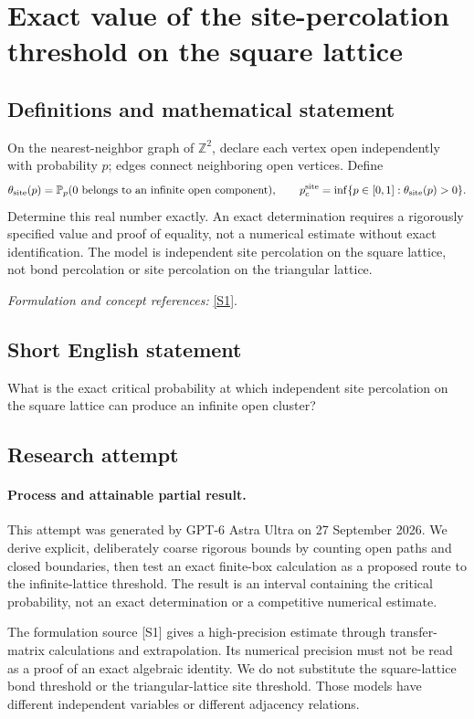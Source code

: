 \documentclass[11pt]{article}
\begin{document}
\section*{\texorpdfstring{Exact value of the site-percolation threshold on the square lattice}{Exact value of the site-percolation threshold on the square lattice}}\label{statement}
\subsection{Definitions and mathematical statement}
On the nearest-neighbor graph of ${\mathbb{Z}}^2$, declare each vertex open independently with probability $p$; edges connect neighboring open vertices. Define
\[
 \theta_{\rm site}(p)={\mathbb{P}}_p(0\text{ belongs to an infinite open component}),
 \qquad
 p_c^{\rm site}=\inf\{p\in[0,1]:\theta_{\rm site}(p)>0\}.
\]
Determine this real number exactly. An exact determination requires a rigorously specified value and proof of equality, not a numerical estimate without exact identification. The model is independent site percolation on the square lattice, not bond percolation or site percolation on the triangular lattice.
\par\smallskip\textit{Formulation and concept references:} \href{https://arxiv.org/abs/1507.03027}{[S1]}.

\subsection{Short English statement}
What is the exact critical probability at which independent site percolation on the square lattice can produce an infinite open cluster?
\subsection{Research attempt}
\paragraph{Process and attainable partial result.}
This attempt was generated by GPT-6 Astra Ultra on 27 September 2026. We derive explicit, deliberately coarse rigorous bounds by counting open paths and closed boundaries, then test an exact finite-box calculation as a proposed route to the infinite-lattice threshold. The result is an interval containing the critical probability, not an exact determination or a competitive numerical estimate.

The formulation source [S1] gives a high-precision estimate through transfer-matrix calculations and extrapolation. Its numerical precision must not be read as a proof of an exact algebraic identity. We do not substitute the square-lattice bond threshold or the triangular-lattice site threshold. Those models have different independent variables or different adjacency relations.
\end{document}
